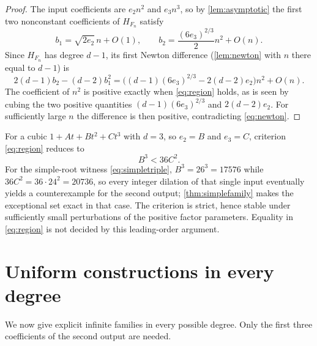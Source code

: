 \documentclass[11pt,letterpaper]{article}
\numberwithin{equation}{section}
\newtheorem{proposition}[theorem]{Proposition}
\theoremstyle{definition}
\theoremstyle{remark}
\begin{document}
\begin{proof}
The input coefficients are $e_2n^2$ and $e_3n^3$, so by \cref{lem:asymptotic}
the first two nonconstant coefficients of $H_{F_n}$ satisfy
\[
 b_1=\sqrt{2e_2}\,n+O(1),\qquad
 b_2=\frac{(6e_3)^{2/3}}2n^2+O(n).
\]
Since $H_{F_n}$ has degree $d-1$, its first Newton difference
(\cref{lem:newton} with $n$ there equal to $d-1$) is
\[
 2(d-1)b_2-(d-2)b_1^2
 =\bigl((d-1)(6e_3)^{2/3}-2(d-2)e_2\bigr)n^2+O(n).
\]
The coefficient of $n^2$ is positive exactly when \eqref{eq:region} holds, as
is seen by cubing the two positive quantities $(d-1)(6e_3)^{2/3}$ and
$2(d-2)e_2$. For sufficiently large $n$ the difference is then positive,
contradicting \eqref{eq:newton}.
\end{proof}

For a cubic $1+At+Bt^2+Ct^3$ with $d=3$, so $e_2=B$ and $e_3=C$, criterion
\eqref{eq:region} reduces to
\begin{equation}\label{eq:cubicregion}
 B^3<36C^2 .
\end{equation}
For the simple-root witness \eqref{eq:simpletriple},
$B^3=26^3=17576$ while $36C^2=36\cdot24^2=20736$, so every integer dilation of
that single input eventually yields a counterexample for the second output;
\cref{thm:simplefamily} makes the exceptional set exact in that case.
The criterion is strict, hence stable under sufficiently small perturbations
of the positive factor parameters. Equality in \eqref{eq:region} is not
decided by this leading-order argument.

\section{Uniform constructions in every degree}\label{sec:everydegree}

We now give explicit infinite families in every possible degree. Only the
first three coefficients of the second output are needed.
\end{document}
